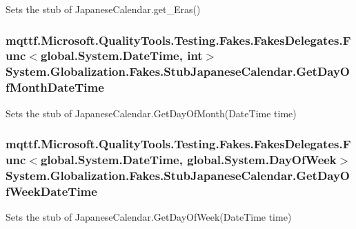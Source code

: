 Sets the stub of Japanese\-Calendar.\-get\-\_\-\-Eras()

\hypertarget{class_system_1_1_globalization_1_1_fakes_1_1_stub_japanese_calendar_aed1e4319a16e05f048a8e233beac7779}{
\subsubsection[{Get\-Day\-Of\-Month\-Date\-Time}]{\setlength{\rightskip}{0pt plus 5cm}mqttf.\-Microsoft.\-Quality\-Tools.\-Testing.\-Fakes.\-Fakes\-Delegates.\-Func$<$global.\-System.\-Date\-Time, int$>$ System.\-Globalization.\-Fakes.\-Stub\-Japanese\-Calendar.\-Get\-Day\-Of\-Month\-Date\-Time}}\label{class_system_1_1_globalization_1_1_fakes_1_1_stub_japanese_calendar_aed1e4319a16e05f048a8e233beac7779}


Sets the stub of Japanese\-Calendar.\-Get\-Day\-Of\-Month(\-Date\-Time time)

\hypertarget{class_system_1_1_globalization_1_1_fakes_1_1_stub_japanese_calendar_acc67f4bf56218861620e05952e223469}{
\subsubsection[{Get\-Day\-Of\-Week\-Date\-Time}]{\setlength{\rightskip}{0pt plus 5cm}mqttf.\-Microsoft.\-Quality\-Tools.\-Testing.\-Fakes.\-Fakes\-Delegates.\-Func$<$global.\-System.\-Date\-Time, global.\-System.\-Day\-Of\-Week$>$ System.\-Globalization.\-Fakes.\-Stub\-Japanese\-Calendar.\-Get\-Day\-Of\-Week\-Date\-Time}}\label{class_system_1_1_globalization_1_1_fakes_1_1_stub_japanese_calendar_acc67f4bf56218861620e05952e223469}


Sets the stub of Japanese\-Calendar.\-Get\-Day\-Of\-Week(\-Date\-Time time)

